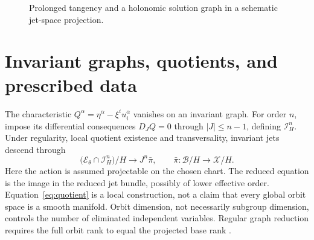 \documentclass[11pt,a4paper,oneside]{report}
\numberwithin{equation}{chapter}
\newcommand{\E}{\mathcal E}
\newcommand{\pr}{\operatorname{pr}}
\begin{document}
\begin{figure}[htbp]\centering
{}
\caption{Prolonged tangency and a holonomic solution graph in a schematic jet-space projection.}\label{fig:jet}
\end{figure}

\section{Invariant graphs, quotients, and prescribed data}
The characteristic $Q^\alpha=\eta^\alpha-\xi^iu_i^\alpha$ vanishes on an invariant graph. For order $n$, impose its differential consequences $D_JQ=0$ through $|J|\le n-1$, defining $\mathcal I_H^n$. Under regularity, local quotient existence and transversality, invariant jets descend through
\begin{equation}\label{eq:quotient}
\bigl(\E_\theta\cap\mathcal I_H^n\bigr)/H
\longrightarrow J^n\bar\pi,\qquad
\bar\pi:\mathcal B/H\longrightarrow\mathcal X/H.
\end{equation}
Here the action is assumed projectable on the chosen chart. The reduced equation is the image in the reduced jet bundle, possibly of lower effective order. Equation~\eqref{eq:quotient} is a local construction, not a claim that every global orbit space is a smooth manifold. Orbit dimension, not necessarily subgroup dimension, controls the number of eliminated independent variables. Regular graph reduction requires the full orbit rank to equal the projected base rank \cite{olver1986,anderson2000}.
\end{document}
